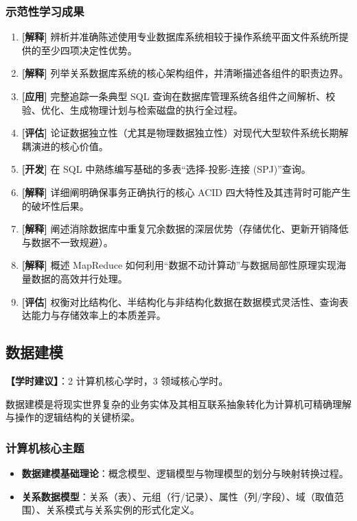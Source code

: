 \subsubsection{示范性学习成果}
\begin{enumerate}
    \item \textbf{[解释]} 辨析并准确陈述使用专业数据库系统相较于操作系统平面文件系统所提供的至少四项决定性优势。
    \item \textbf{[解释]} 列举关系数据库系统的核心架构组件，并清晰描述各组件的职责边界。
    \item \textbf{[应用]} 完整追踪一条典型 SQL 查询在数据库管理系统各组件之间解析、校验、优化、生成物理计划与检索磁盘的执行全过程。
    \item \textbf{[评估]} 论证数据独立性（尤其是物理数据独立性）对现代大型软件系统长期解耦演进的核心价值。
    \item \textbf{[开发]} 在 SQL 中熟练编写基础的多表“选择-投影-连接 (SPJ)”查询。
    \item \textbf{[解释]} 详细阐明确保事务正确执行的核心 ACID 四大特性及其违背时可能产生的破坏性后果。
    \item \textbf{[解释]} 阐述消除数据库中重复冗余数据的深层优势（存储优化、更新开销降低与数据不一致规避）。
    \item \textbf{[解释]} 概述 MapReduce 如何利用“数据不动计算动”与数据局部性原理实现海量数据的高效并行处理。
    \item \textbf{[评估]} 权衡对比结构化、半结构化与非结构化数据在数据模式灵活性、查询表达能力与存储效率上的本质差异。
\end{enumerate}

\subsection{数据建模}
\textbf{【学时建议】}：2 计算机核心学时，3 领域核心学时。

数据建模是将现实世界复杂的业务实体及其相互联系抽象转化为计算机可精确理解与操作的逻辑结构的关键桥梁。

\subsubsection{计算机核心主题}
\begin{itemize}
    \item \textbf{数据建模基础理论}：概念模型、逻辑模型与物理模型的划分与映射转换过程。
    \item \textbf{关系数据模型}：关系（表）、元组（行/记录）、属性（列/字段）、域（取值范围）、关系模式与关系实例的形式化定义。
\end{itemize}

